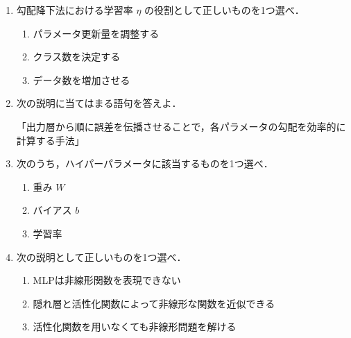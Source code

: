 \documentclass[uplatex,a4paper,12pt]{jsarticle}
\begin{document}
\begin{enumerate}
\item 勾配降下法における学習率 $\eta$ の役割として正しいものを1つ選べ．
\begin{enumerate}[label=(\alph*)]
\item パラメータ更新量を調整する
\item クラス数を決定する
\item データ数を増加させる
\end{enumerate}

\item 次の説明に当てはまる語句を答えよ．

「出力層から順に誤差を伝播させることで，各パラメータの勾配を効率的に計算する手法」

\item 次のうち，ハイパーパラメータに該当するものを1つ選べ．
\begin{enumerate}[label=(\alph*)]
\item 重み $W$
\item バイアス $b$
\item 学習率
\end{enumerate}

\item 次の説明として正しいものを1つ選べ．
\begin{enumerate}[label=(\alph*)]
\item MLPは非線形関数を表現できない
\item 隠れ層と活性化関数によって非線形な関数を近似できる
\item 活性化関数を用いなくても非線形問題を解ける
\end{enumerate}

\end{enumerate}
\end{document}
